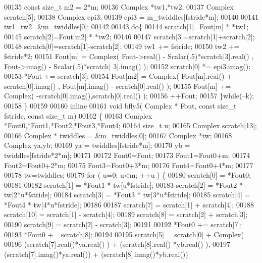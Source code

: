\begin{DoxyCode}
00135       \textcolor{keyword}{const} \textcolor{keywordtype}{size\_t} m2 = 2*m;
00136       Complex *tw1,*tw2;
00137       Complex scratch[5];
00138       Complex epi3;
00139       epi3 = m\_twiddles[fstride*m];
00140 
00141       tw1=tw2=&m\_twiddles[0];
00142 
00143       \textcolor{keywordflow}{do}\{
00144         scratch[1]=Fout[m] * *tw1;
00145         scratch[2]=Fout[m2] * *tw2;
00146 
00147         scratch[3]=scratch[1]+scratch[2];
00148         scratch[0]=scratch[1]-scratch[2];
00149         tw1 += fstride;
00150         tw2 += fstride*2;
00151         Fout[m] = Complex( Fout->real() - Scalar(.5)*scratch[3].real() , Fout->imag() - Scalar(.5)*scratch[
      3].imag() );
00152         scratch[0] *= epi3.imag();
00153         *Fout += scratch[3];
00154         Fout[m2] = Complex(  Fout[m].real() + scratch[0].imag() , Fout[m].imag() - scratch[0].real() );
00155         Fout[m] += Complex( -scratch[0].imag(),scratch[0].real() );
00156         ++Fout;
00157       \}\textcolor{keywordflow}{while}(--k);
00158     \}
00159 
00160   \textcolor{keyword}{inline}
00161     \textcolor{keywordtype}{void} bfly5( Complex * Fout, \textcolor{keyword}{const} \textcolor{keywordtype}{size\_t} fstride, \textcolor{keyword}{const} \textcolor{keywordtype}{size\_t} m)
00162     \{
00163       Complex *Fout0,*Fout1,*Fout2,*Fout3,*Fout4;
00164       \textcolor{keywordtype}{size\_t} u;
00165       Complex scratch[13];
00166       Complex * twiddles = &m\_twiddles[0];
00167       Complex *tw;
00168       Complex ya,yb;
00169       ya = twiddles[fstride*m];
00170       yb = twiddles[fstride*2*m];
00171 
00172       Fout0=Fout;
00173       Fout1=Fout0+m;
00174       Fout2=Fout0+2*m;
00175       Fout3=Fout0+3*m;
00176       Fout4=Fout0+4*m;
00177 
00178       tw=twiddles;
00179       \textcolor{keywordflow}{for} ( u=0; u<m; ++u ) \{
00180         scratch[0] = *Fout0;
00181 
00182         scratch[1]  = *Fout1 * tw[u*fstride];
00183         scratch[2]  = *Fout2 * tw[2*u*fstride];
00184         scratch[3]  = *Fout3 * tw[3*u*fstride];
00185         scratch[4]  = *Fout4 * tw[4*u*fstride];
00186 
00187         scratch[7] = scratch[1] + scratch[4];
00188         scratch[10] = scratch[1] - scratch[4];
00189         scratch[8] = scratch[2] + scratch[3];
00190         scratch[9] = scratch[2] - scratch[3];
00191 
00192         *Fout0 +=  scratch[7];
00193         *Fout0 +=  scratch[8];
00194 
00195         scratch[5] = scratch[0] + Complex(
00196             (scratch[7].real()*ya.real() ) + (scratch[8].real() *yb.real() ),
00197             (scratch[7].imag()*ya.real()) + (scratch[8].imag()*yb.real())

\end{DoxyCode}
